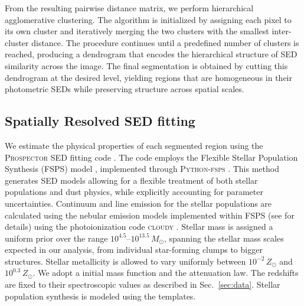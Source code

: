 \documentclass[fleqn,usenatbib]{mnras}
\begin{document}
From the resulting pairwise distance matrix, we perform hierarchical agglomerative clustering. The algorithm is initialized by assigning each pixel to its own cluster and iteratively merging the two clusters with the smallest inter-cluster distance. The procedure continues until a predefined number of clusters is reached, producing a dendrogram that encodes the hierarchical structure of SED similarity across the image. The final segmentation is obtained by cutting this dendrogram at the desired level, yielding regions that are homogeneous in their photometric SEDs while preserving structure across spatial scales.




\subsection{Spatially Resolved SED fitting}

We estimate the physical properties of each segmented region using the \textsc{Prospector} SED fitting code \citep[][]{2021Johnson_Prospector}. The code employs the Flexible Stellar Population Synthesis (FSPS) model \citep{2009Conroy}, implemented through  \textsc{Python-fsps} \citep{2014PyFSPS}.  This method generates SED models allowing for a flexible treatment of both stellar populations and dust physics, while explicitly accounting for parameter uncertainties. 
Continuum and line emission for the stellar populations are calculated using the nebular emission models implemented within FSPS (see \citealt{2017Byler_fspsmodels} for details) using the photoionization code \textsc{cloudy} \citep{1998Ferland_Cloudy}. 
Stellar mass is assigned a uniform prior over the range $10^{4.5}$–$10^{13.5}\,M_{\odot}$, spanning the stellar mass scales expected in our analysis, from individual star-forming clumps to bigger structures.
Stellar metallicity is allowed to vary uniformly between $10^{-2}\,Z_{\odot}$ and $10^{0.3}\,Z_{\odot}$. We adopt a \citet{2003Chabrier_IMF} initial mass function and the \citet{2000Calzetti_DustAttenuation} attenuation law. The redshifts are fixed to their spectroscopic values as described in Sec.~\ref{sec:data}. Stellar population synthesis is modeled using the \citet{Bruzual2003} templates. 
\end{document}
